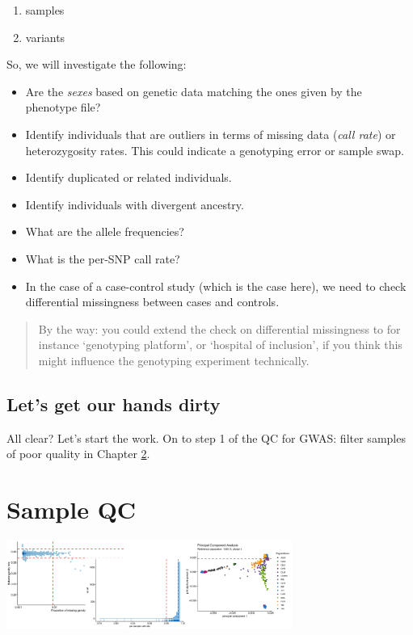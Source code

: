 \documentclass[
]{book}
\providecommand{\tightlist}{%
  \setlength{\itemsep}{0pt}\setlength{\parskip}{0pt}}
\begin{document}
\begin{enumerate}
\def\labelenumi{\arabic{enumi})}
\tightlist
\item
  samples
\item
  variants
\end{enumerate}

So, we will investigate the following:

\begin{itemize}
\tightlist
\item
  Are the \emph{sexes} based on genetic data matching the ones given by the phenotype file?
\item
  Identify individuals that are outliers in terms of missing data (\emph{call rate}) or heterozygosity rates. This could indicate a genotyping error or sample swap.
\item
  Identify duplicated or related individuals.
\item
  Identify individuals with divergent ancestry.
\item
  What are the allele frequencies?
\item
  What is the per-SNP call rate?
\item
  In the case of a case-control study (which is the case here), we need to check differential missingness between cases and controls.
\end{itemize}

\begin{quote}
By the way: you could extend the check on differential missingness to for instance `genotyping platform', or `hospital of inclusion', if you think this might influence the genotyping experiment technically.
\end{quote}

\hypertarget{lets-get-our-hands-dirty}{%
\section{Let's get our hands dirty}\label{lets-get-our-hands-dirty}}

All clear? Let's start the work. On to step 1 of the QC for GWAS: filter samples of poor quality in Chapter \ref{gwas-basics-sample-qc}.

\hypertarget{gwas-basics-sample-qc}{%
\chapter{Sample QC}\label{gwas-basics-sample-qc}}

\includegraphics[width=0.7\textwidth,height=\textheight]{img/_gwas_dummy/gwas_sample_qc.png}
\end{document}
